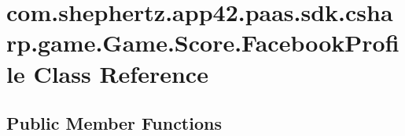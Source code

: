 \hypertarget{classcom_1_1shephertz_1_1app42_1_1paas_1_1sdk_1_1csharp_1_1game_1_1_game_1_1_score_1_1_facebook_profile}{\section{com.\+shephertz.\+app42.\+paas.\+sdk.\+csharp.\+game.\+Game.\+Score.\+Facebook\+Profile Class Reference}
\label{classcom_1_1shephertz_1_1app42_1_1paas_1_1sdk_1_1csharp_1_1game_1_1_game_1_1_score_1_1_facebook_profile}
}
\subsection*{Public Member Functions}
